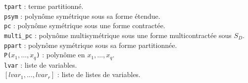 \documentclass[11pt]{article}
\begin{document}
{\tt tpart} : terme partitionn\'{e}.\\

{\tt psym} : polyn\^{o}me sym\'{e}trique sous sa forme \'etendue.\\

{\tt pc} : polyn\^{o}me sym\'etrique sous une forme contract\'{ee}.\\

{\tt multi\_pc} : polyn\^{o}me multisym\'etrique sous une forme
multicontract\'{ee} sous $S_D$.\\

{\tt ppart} : polyn\^{o}me sym\'etrique sous sa forme partitionn\'{ee}.\\

{\tt P($x_1, \ldots , x_q$)} :  polyn\^{o}me en $x_1, \ldots , x_q$.\\

{\tt lvar} : liste de variables.\\

$[lvar_1, \ldots,lvar_r]$ : liste de listes de variables.


\tableofcontents 
\end{document}
